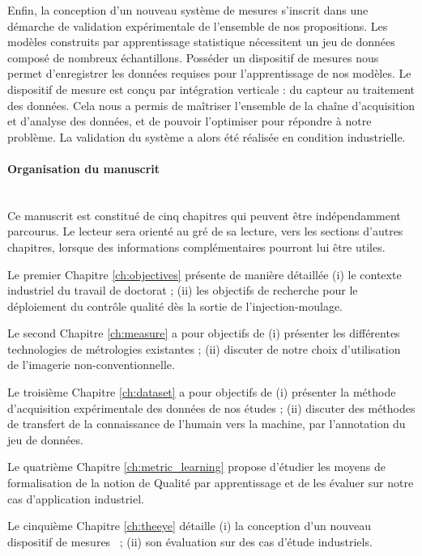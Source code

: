 Enfin, la conception d'un nouveau système de mesures s'inscrit dans une démarche de validation expérimentale de l'ensemble de nos propositions.
Les modèles construits par apprentissage statistique nécessitent un jeu de données composé de nombreux échantillons.
Posséder un dispositif de mesures nous permet d'enregistrer les données requises pour l'apprentissage de nos modèles.
Le dispositif de mesure est conçu par intégration verticale : du capteur au traitement des données.
Cela nous a permis de maîtriser l'ensemble de la chaîne d'acquisition et d'analyse des données, et de pouvoir l'optimiser pour répondre à notre problème.
La validation du système a alors été réalisée en condition industrielle.

\bigskip
\paragraph{Organisation du manuscrit}\mbox{} \\

Ce manuscrit est constitué de cinq chapitres qui peuvent être indépendamment parcourus.
Le lecteur sera orienté au gré de sa lecture, vers les sections d'autres chapitres, lorsque des informations complémentaires pourront lui être utiles.

Le premier Chapitre \ref{ch:objectives} présente de manière détaillée (i) le contexte industriel du travail de doctorat ; (ii) les objectifs de recherche pour le déploiement du contrôle qualité dès la sortie de l'injection-moulage.

Le second Chapitre \ref{ch:measure} a pour objectifs de (i) présenter les différentes technologies de métrologies existantes ; (ii) discuter de notre choix d'utilisation de l'imagerie non-conventionnelle.

Le troisième Chapitre \ref{ch:dataset} a pour objectifs de (i) présenter la méthode d'acquisition expérimentale des données de nos études ; (ii) discuter des méthodes de transfert de la connaissance de l'humain vers la machine, par l'annotation du jeu de données.

Le quatrième Chapitre \ref{ch:metric_learning} propose d'étudier les moyens de formalisation de la notion de Qualité par apprentissage et de les évaluer sur notre cas d'application industriel.

Le cinquième Chapitre \ref{ch:theeye} détaille (i) la conception d'un nouveau dispositif de mesures \ ; (ii) son évaluation sur des cas d'étude industriels.

